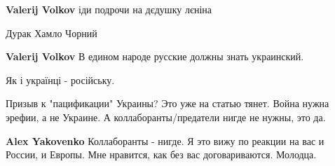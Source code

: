 \begin{itemize}
\begin{itemize}
\textbf{Valerij Volkov} іди подрочи на дєдушку лєніна

 
Дурак
Хамло
Чорний

 
\textbf{Valerij Volkov} В едином народе русские должны знать украинский.

 
Як і українці - російську.
\end{itemize}

 

Призыв к "пацификации" Украины? Это уже на статью тянет. Война нужна эрефии, а
не Украине. А коллаборанты/предатели нигде не нужны, это да.

\begin{itemize}
 
\textbf{Alex Yakovenko} Коллаборанты - нигде. Я это вижу по реакции на вас и России, и Европы. Мне нравится, как без вас договариваются. Молодца.

 

\end{itemize}
\end{itemize}
